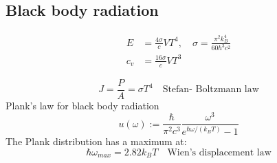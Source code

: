 \subsection*{Black body radiation}

\[
    \begin{aligned}
        E &= \frac{4 \sigma}{c} V T^4 , \quad \sigma = \frac{\pi^2 k_B^4}{60 \hbar^3 c^2} \\
        c_v &= \frac{16 \sigma}{c} V T^3
    \end{aligned}
\]

\[
    J = \frac{P}{A} = \sigma T^4 \quad \text{Stefan- Boltzmann law}
\]
Plank's law for black body radiation
\[
    u(\omega) := \frac{\hbar}{\pi^2 c^3} \frac{\omega^3}{e^{\hbar\omega/(k_BT)}-1}
\]
The Plank distribution has a maximum at:
\[
    \hbar \omega_{max} = 2.82 k_B T \quad \text{Wien's displacement law}
\]